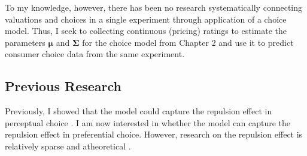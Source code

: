 To my knowledge, however, there has been no research systematically connecting valuations and choices in a single experiment through application of a choice model. Thus, I seek to collecting continuous (pricing) ratings to estimate the parameters $\boldsymbol{\mu}$ and $\boldsymbol{\Sigma}$ for the choice model from Chapter 2 and use it to predict consumer choice data from the same experiment.

\subsection{Previous Research}
Previously, I showed that the model could capture the repulsion effect in perceptual choice \parencite{spektorWhenGoodLooks2018b}. I am now interested in whether the model can capture the repulsion effect in preferential choice. However, research on the repulsion effect is relatively sparse and atheoretical \parencite{liaoInfluenceDistanceDecoy2021,simonson2014vices,spektorRepulsionEffectPreferential2022}.  